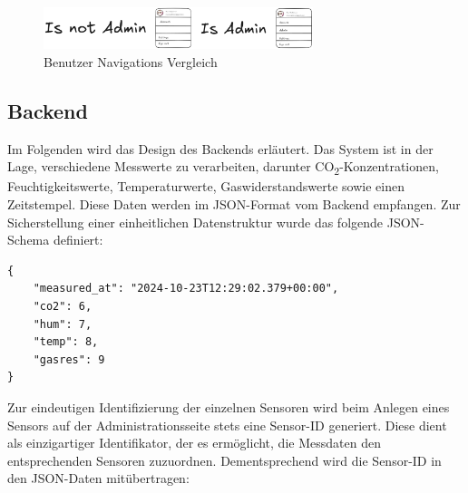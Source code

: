 \begin{inhalt}
\begin{figure}[!htb] 
\centering 
\includegraphics[width=0.7\textwidth]{files/Thomas/pics/Design-Grundlagen/Frontend/Sidebar/sidebar-nav-user-adminvsnotadmin.png} 
\caption[Bildbezeichnung für Abbildungsverzeichnis]{Benutzer Navigations Vergleich} 
\label{fig:gehaeuse_internet_bild} 
\end{figure}

\newpage

































\subsection{Backend}

Im Folgenden wird das Design des Backends erläutert. Das System ist in der Lage, verschiedene Messwerte zu verarbeiten, darunter CO\textsubscript{2}-Konzentrationen, Feuchtigkeitswerte, Temperaturwerte, Gaswiderstandswerte sowie einen Zeitstempel. Diese Daten werden im JSON-Format vom Backend empfangen. Zur Sicherstellung einer einheitlichen Datenstruktur wurde das folgende JSON-Schema definiert:

\begin{lstlisting}[style=myjson]
{
    "measured_at": "2024-10-23T12:29:02.379+00:00",
    "co2": 6,
    "hum": 7,
    "temp": 8,
    "gasres": 9
}
\end{lstlisting}

\vspace{3cm}

Zur eindeutigen Identifizierung der einzelnen Sensoren wird beim Anlegen eines Sensors auf der Administrationsseite stets eine Sensor-ID generiert. Diese dient als einzigartiger Identifikator, der es ermöglicht, die Messdaten den entsprechenden Sensoren zuzuordnen. Dementsprechend wird die Sensor-ID in den JSON-Daten mitübertragen:


\end{inhalt}
